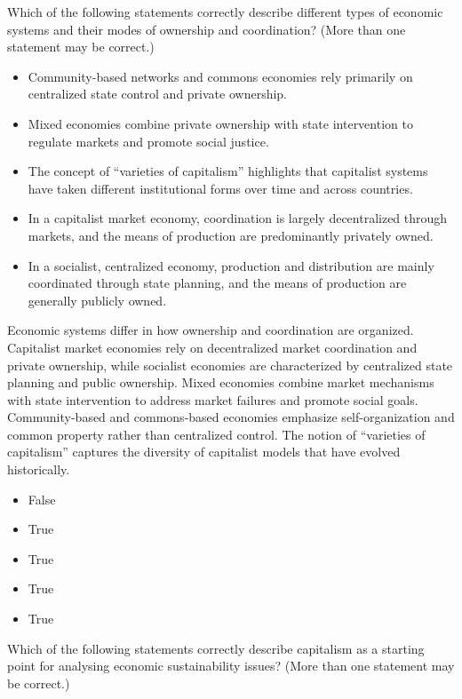 \documentclass[
  a4paper,
  DIV=11,
  numbers=noendperiod,
  oneside,
  openany]{scrreprt}
\providecommand{\tightlist}{%
  \setlength{\itemsep}{0pt}\setlength{\parskip}{0pt}}
\begin{document}
Which of the following statements correctly describe different types of
economic systems and their modes of ownership and coordination? (More
than one statement may be correct.)

\begin{itemize}
\tightlist
\item[$\square$]
  Community-based networks and commons economies rely primarily on
  centralized state control and private ownership.
\item[$\square$]
  Mixed economies combine private ownership with state intervention to
  regulate markets and promote social justice.
\item[$\square$]
  The concept of ``varieties of capitalism'' highlights that capitalist
  systems have taken different institutional forms over time and across
  countries.
\item[$\square$]
  In a capitalist market economy, coordination is largely decentralized
  through markets, and the means of production are predominantly
  privately owned.
\item[$\square$]
  In a socialist, centralized economy, production and distribution are
  mainly coordinated through state planning, and the means of production
  are generally publicly owned.
\end{itemize}

Economic systems differ in how ownership and coordination are organized.
Capitalist market economies rely on decentralized market coordination
and private ownership, while socialist economies are characterized by
centralized state planning and public ownership. Mixed economies combine
market mechanisms with state intervention to address market failures and
promote social goals. Community-based and commons-based economies
emphasize self-organization and common property rather than centralized
control. The notion of ``varieties of capitalism'' captures the
diversity of capitalist models that have evolved historically.

\begin{itemize}
\tightlist
\item
  False
\item
  True
\item
  True
\item
  True
\item
  True
\end{itemize}

Which of the following statements correctly describe capitalism as a
starting point for analysing economic sustainability issues? (More than
one statement may be correct.)
\end{document}
